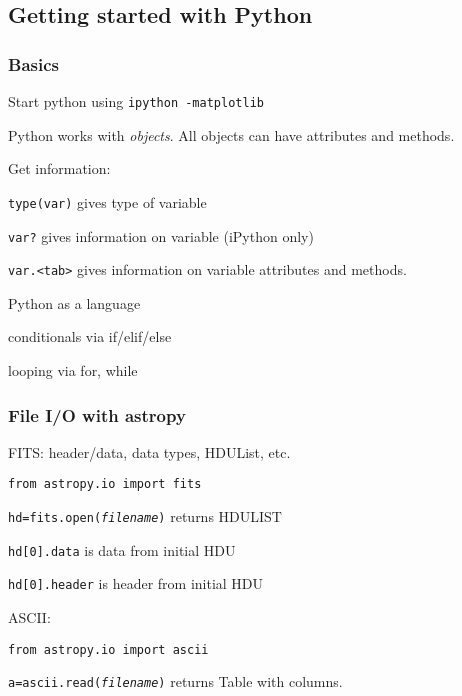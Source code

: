 \documentclass{article}
\begin{document}
\subsection{Getting started with Python}
\subsubsection{Basics}
\begin{itemize*}
    \item Start python using \texttt{ipython -matplotlib}
    \item Python works with \emph{objects}. All objects can have
        attributes and methods.
    \item Get information:
        \begin{itemize*}
            \item \texttt{type(var)} gives type of variable
            \item \texttt{var?} gives information on variable (iPython
                only)
            \item \texttt{var.<tab>} gives information on variable
                attributes and methods.
        \end{itemize*}
    \item Python as a language
        \begin{itemize*}
            \item conditionals via if/elif/else
            \item looping via for, while
        \end{itemize*}
\end{itemize*}

\subsubsection{File I/O with astropy}
\begin{itemize*}
    \item FITS: header/data, data types, HDUList, etc.
        \begin{itemize*}
            \item \texttt{from astropy.io import fits}
            \item \texttt{hd=fits.open(\emph{filename})}
                returns HDULIST
            \item \texttt{hd[0].data} is data from initial HDU
            \item \texttt{hd[0].header} is header from initial HDU
        \end{itemize*}
    \item ASCII:
        \begin{itemize*}
            \item \texttt{from astropy.io import ascii}
            \item \texttt{a=ascii.read(\emph{filename})} returns Table with columns.
        \end{itemize*}
\end{itemize*}
\end{document}
